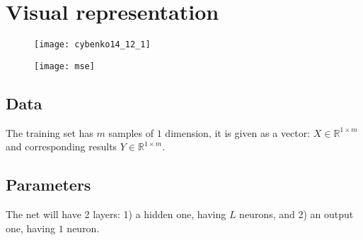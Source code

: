 \documentclass[]{article}
\theoremstyle{definition}
\begin{document}
\newpage

\section{Visual representation}

\begin{figure}[h!]
	\centering
	\texttt{[image: cybenko14\_12\_1]}

\end{figure}

\begin{figure}[h!]
	\centering
	\texttt{[image: mse]}

\end{figure}







\newpage
\subsection{Data}

The training set has $m$ samples of $1$ dimension, it is given as a vector: $X \in \mathbb{R}^{1\times m}$ and corresponding results
$Y\in \mathbb{R}^{1\times m}$.

\subsection{Parameters}

The net will have 2 layers: 1) a hidden one, having $L$ neurons,
and 2) an output one, having $1$ neuron.
\end{document}
